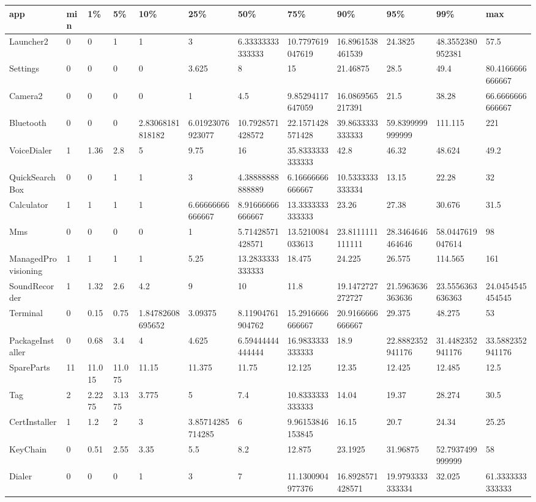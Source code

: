 \documentclass[a4paper]{article}
\begin{document}
\begin{tabular}{|l|l|l|l|l|l|l|l|l|l|l|l|}
\hline
app&min&1\%&5\%&10\%&25\%&50\%&75\%&90\%&95\%&99\%&max\\
\hline
Launcher2&0&0&1&1&3&6.33333333333333&10.7797619047619&16.8961538461539&24.3825&48.3552380952381&57.5\\
\hline
Settings&0&0&0&0&3.625&8&15&21.46875&28.5&49.4&80.4166666666667\\
\hline
Camera2&0&0&0&0&1&4.5&9.85294117647059&16.0869565217391&21.5&38.28&66.6666666666667\\
\hline
Bluetooth&0&0&0&2.83068181818182&6.01923076923077&10.7928571428572&22.1571428571428&39.8633333333333&59.8399999999999&111.115&221\\
\hline
VoiceDialer&1&1.36&2.8&5&9.75&16&35.8333333333333&42.8&46.32&48.624&49.2\\
\hline
QuickSearchBox&0&0&1&1&3&4.38888888888889&6.16666666666667&10.5333333333334&13.15&22.28&32\\
\hline
Calculator&1&1&1&1&6.66666666666667&8.91666666666667&13.3333333333333&23.26&27.38&30.676&31.5\\
\hline
Mms&0&0&0&0&1&5.71428571428571&13.5210084033613&23.8111111111111&28.3464646464646&58.0447619047614&98\\
\hline
ManagedProvisioning&1&1&1&1&5.25&13.2833333333333&18.475&24.225&26.575&114.565&161\\
\hline
SoundRecorder&1&1.32&2.6&4.2&9&10&11.8&19.1472727272727&21.5963636363636&23.5556363636363&24.0454545454545\\
\hline
Terminal&0&0.15&0.75&1.84782608695652&3.09375&8.11904761904762&15.2916666666667&20.9166666666667&29.375&48.275&53\\
\hline
PackageInstaller&0&0.68&3.4&4&4.625&6.59444444444444&16.9833333333333&18.9&22.8882352941176&31.4482352941176&33.5882352941176\\
\hline
SpareParts&11&11.015&11.075&11.15&11.375&11.75&12.125&12.35&12.425&12.485&12.5\\
\hline
Tag&2&2.2275&3.1375&3.775&5&7.4&10.8333333333333&14.04&19.37&28.274&30.5\\
\hline
CertInstaller&1&1.2&2&3&3.85714285714285&6&9.96153846153845&16.15&20.7&24.34&25.25\\
\hline
KeyChain&0&0.51&2.55&3.35&5.5&8.2&12.875&23.1925&31.96875&52.7937499999999&58\\
\hline
Dialer&0&0&0&1&3&7&11.1300904977376&16.8928571428571&19.9793333333334&32.025&61.3333333333333\\
\hline

\end{tabular}
\end{document}
